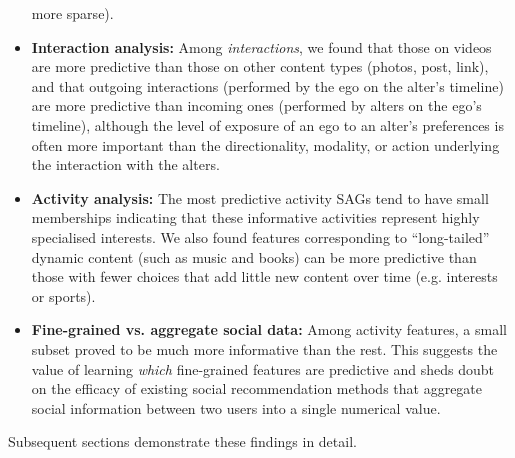 \begin{itemize}
more sparse).
\item {\bf Interaction analysis:} 
Among \emph{interactions}, we found that those on videos are more
predictive than those on other content types (photos, post, link), and
that outgoing interactions (performed by the ego on the alter's
timeline) are more predictive than incoming ones (performed by alters
on the ego's timeline), although the level of exposure of an ego to an
alter's preferences is often more important than the directionality,
modality, or action underlying the interaction with the alters.
\item {\bf Activity analysis:}
The most predictive activity SAGs tend to have small memberships
indicating that these informative activities represent highly
specialised interests.  We also found features corresponding to
``long-tailed'' dynamic content (such as music and books) can be more
predictive than those with fewer choices that add little new content
over time (e.g. interests or sports).
\item {\bf Fine-grained vs. aggregate social data:}
Among activity features, a small subset proved to be much more informative
than the rest.  This suggests the value of
learning \emph{which} fine-grained features are predictive and sheds
doubt on the efficacy of existing social recommendation methods that
aggregate social information between two users into a single numerical
value.
\end{itemize}
Subsequent sections demonstrate these findings in detail.




